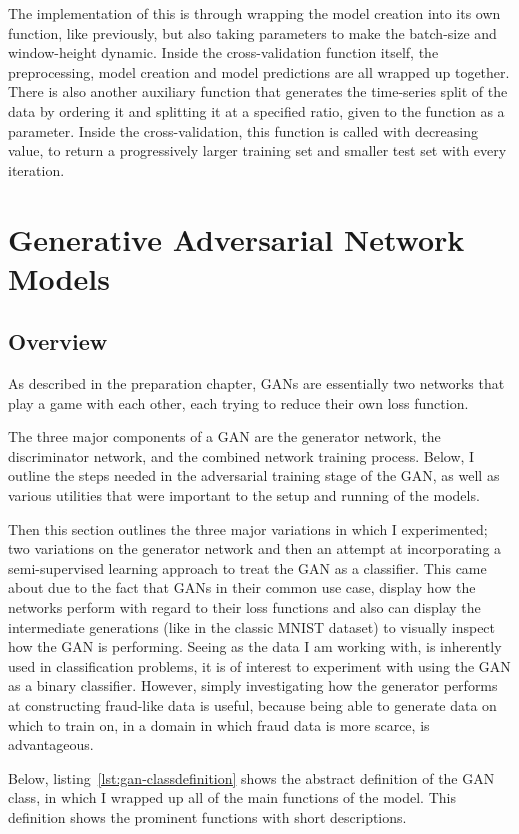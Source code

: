 \documentclass[12pt,a4paper,twoside]{report}
\begin{document}
The implementation of this is through wrapping the model creation into its own function, like previously, but also taking parameters to make the batch-size and window-height dynamic. Inside the cross-validation function itself, the preprocessing, model creation and model predictions are all wrapped up together. There is also another auxiliary function that generates the time-series split of the data by ordering it and splitting it at a specified ratio, given to the function as a parameter. Inside the cross-validation, this function is called with decreasing value, to return a progressively larger training set and smaller test set with every iteration. 

\section{Generative Adversarial Network Models}

\subsection{Overview}
As described in the preparation chapter, GANs are essentially two networks that play a game with each other, each trying to reduce their own loss function. 

The three major components of a GAN are the generator network, the discriminator network, and the combined network training process. Below, I outline the steps needed in the adversarial training stage of the GAN, as well as various utilities that were important to the setup and running of the models. 

Then this section outlines the three major variations in which I experimented; two variations on the generator network and then an attempt at incorporating a semi-supervised learning approach to treat the GAN as a classifier. This came about due to the fact that GANs in their common use case, display how the networks perform with regard to their loss functions and also can display the intermediate generations (like in the classic MNIST dataset) to visually inspect how the GAN is performing. Seeing as the data I am working with, is inherently used in classification problems, it is of interest to experiment with using the GAN as a binary classifier. However, simply investigating how the generator performs at constructing fraud-like data is useful, because being able to generate data on which to train on, in a domain in which fraud data is more scarce, is advantageous.  

Below, listing~\ref{lst:gan-classdefinition} shows the abstract definition of the GAN class, in which I wrapped up all of the main functions of the model. This definition shows the prominent functions with short descriptions. 

\end{document}
